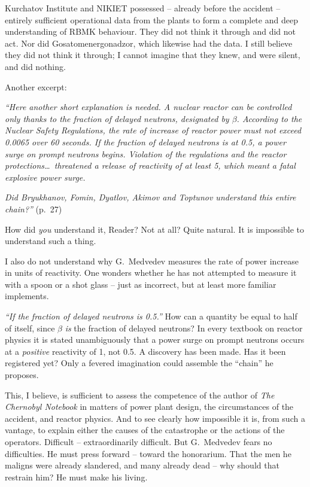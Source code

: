 \documentclass[openright]{bookest}
\begin{document}
Kurchatov Institute and NIKIET possessed -- already before the accident -- entirely sufficient operational data from the plants to form a complete and deep understanding of RBMK behaviour. They did not think it through and did not act. Nor did Gosatomenergonadzor, which likewise had the data. I still believe they did not think it through; I cannot imagine that they knew, and were silent, and did nothing.

Another excerpt:

\begin{personal}
\textit{``Here another short explanation is needed. A nuclear reactor can be controlled only thanks to the fraction of delayed neutrons, designated by $\beta$. According to the Nuclear Safety Regulations, the rate of increase of reactor power must not exceed \qty{0.0065}{\beta} over \num{60} seconds. If the fraction of delayed neutrons is at \qty{0.5}{\beta}, a power surge on prompt neutrons begins. Violation of the regulations and the reactor protections\ldots~threatened a release of reactivity of at least \qty{5}{\beta}, which meant a fatal explosive power surge.}

\textit{Did Bryukhanov, Fomin, Dyatlov, Akimov and Toptunov understand this entire chain?''} (p.~27)
\end{personal}

How did \textit{you} understand it, Reader? Not at all? Quite natural. It is impossible to understand such a thing.

I also do not understand why G.~Medvedev measures the rate of power increase in units of reactivity. One wonders whether he has not attempted to measure it with a spoon or a shot glass -- just as incorrect, but at least more familiar implements.

\textit{``If the fraction of delayed neutrons is \qty{0.5}{\beta}.''} How can a quantity be equal to half of itself, since $\beta$ \textit{is} the fraction of delayed neutrons? In every textbook on reactor physics it is stated unambiguously that a power surge on prompt neutrons occurs at a \textit{positive} reactivity of \qty{1}{\beta}, not \qty{0.5}{\beta}. A discovery has been made. Has it been registered yet? Only a fevered imagination could assemble the ``chain'' he proposes.

This, I believe, is sufficient to assess the competence of the author of \textit{The Chernobyl Notebook} in matters of power plant design, the circumstances of the accident, and reactor physics. And to see clearly how impossible it is, from such a vantage, to explain either the causes of the catastrophe or the actions of the operators. Difficult -- extraordinarily difficult. But G.~Medvedev fears no difficulties. He must press forward -- toward the honorarium. That the men he maligns were already slandered, and many already dead -- why should that restrain him? He must make his living.
\end{document}
